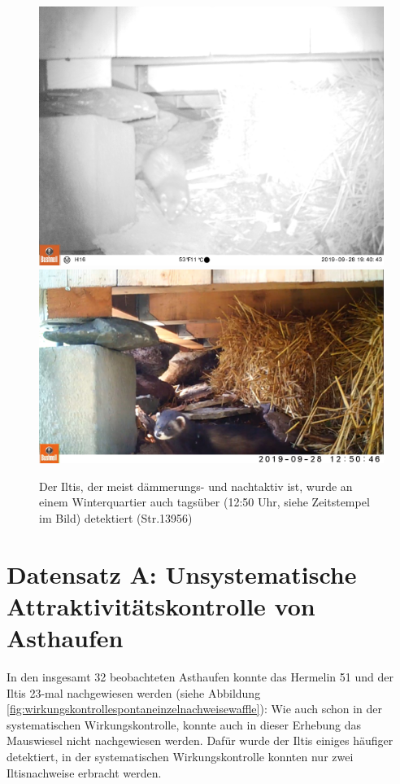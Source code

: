 \documentclass[
]{scrbook}
\begin{document}
\begin{figure}
\includegraphics[width=1\linewidth]{images/str13956/09280317} \includegraphics[width=1\linewidth]{images/str13956/capture} \caption{Der Iltis, der meist dämmerungs- und nachtaktiv ist, wurde an einem Winterquartier auch tagsüber (12:50 Uhr, siehe Zeitstempel im Bild) detektiert (Str.13956)}\label{fig:unnamed-chunk-7}
\end{figure}

\hypertarget{datensatz-a-unsystematische-attraktivituxe4tskontrolle-von-asthaufen-1}{%
\section{Datensatz A: Unsystematische Attraktivitätskontrolle von Asthaufen}\label{datensatz-a-unsystematische-attraktivituxe4tskontrolle-von-asthaufen-1}}

In den insgesamt 32 beobachteten Asthaufen konnte das Hermelin 51 und der Iltis 23-mal nachgewiesen werden (siehe Abbildung \ref{fig:wirkungskontrollespontaneinzelnachweisewaffle}): Wie auch schon in der systematischen Wirkungskontrolle, konnte auch in dieser Erhebung das Mauswiesel nicht nachgewiesen werden. Dafür wurde der Iltis einiges häufiger detektiert, in der systematischen Wirkungskontrolle konnten nur zwei Iltisnachweise erbracht werden.
\end{document}
